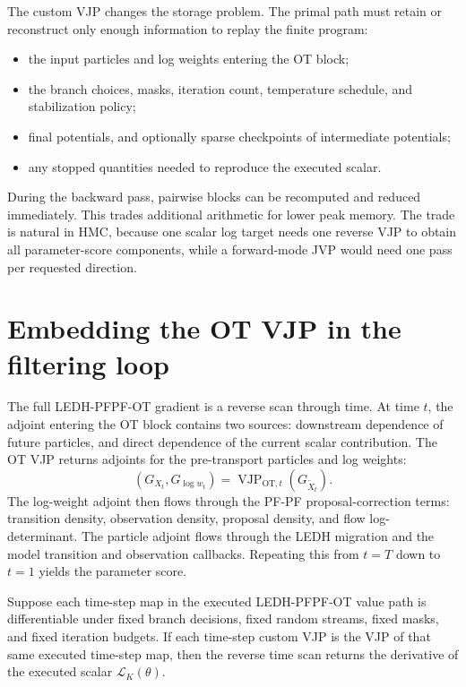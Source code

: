 The custom VJP changes the storage problem.  The primal path must retain or
reconstruct only enough information to replay the finite program:
\begin{itemize}
  \item the input particles and log weights entering the OT block;
  \item the branch choices, masks, iteration count, temperature schedule, and
  stabilization policy;
  \item final potentials, and optionally sparse checkpoints of intermediate
  potentials;
  \item any stopped quantities needed to reproduce the executed scalar.
\end{itemize}
During the backward pass, pairwise blocks can be recomputed and reduced
immediately.  This trades additional arithmetic for lower peak memory.  The
trade is natural in HMC, because one scalar log target needs one reverse VJP to
obtain all parameter-score components, while a forward-mode JVP would need one
pass per requested direction.

\section{Embedding the OT VJP in the filtering loop}
\label{sec:bf-ledh-ot-filter-loop}

The full LEDH-PFPF-OT gradient is a reverse scan through time.  At time \(t\),
the adjoint entering the OT block contains two sources: downstream dependence
of future particles, and direct dependence of the current scalar contribution.
The OT VJP returns adjoints for the pre-transport particles and log weights:
\[
  (G_{X_t},G_{\log w_t})
  =
  \operatorname{VJP}_{\mathrm{OT},t}
  (G_{\widetilde X_t}).
\]
The log-weight adjoint then flows through the PF-PF proposal-correction terms:
transition density, observation density, proposal density, and flow
log-determinant.  The particle adjoint flows through the LEDH migration and the
model transition and observation callbacks.  Repeating this from \(t=T\) down
to \(t=1\) yields the parameter score.

\begin{proposition}
\label{prop:bf-ledh-ot-filtering-loop-vjp}
Suppose each time-step map in the executed LEDH-PFPF-OT value path is
differentiable under fixed branch decisions, fixed random streams, fixed masks,
and fixed iteration budgets.  If each time-step custom VJP is the VJP of that
same executed time-step map, then the reverse time scan returns the derivative
of the executed scalar \(\mathcal L_K(\theta)\).
\end{proposition}

